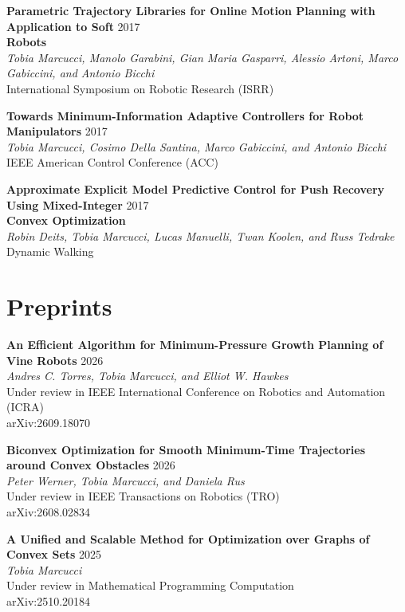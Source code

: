 \documentclass[11pt,a4paper,sans,twoside]{moderncv}
\begin{document}
\begin{enumerate}[label={[C\arabic*]}]
\item \textbf{Parametric Trajectory Libraries for Online Motion Planning with Application to Soft} \hfill 2017 \\ \textbf{Robots}  \\
\textit{Tobia Marcucci, Manolo Garabini, Gian Maria Gasparri, Alessio Artoni, Marco Gabiccini, and Antonio Bicchi} \\
International Symposium on Robotic Research (ISRR)

\item \textbf{Towards Minimum-Information Adaptive Controllers for Robot Manipulators} \hfill 2017 \\
\textit{Tobia Marcucci, Cosimo Della Santina, Marco Gabiccini, and Antonio Bicchi} \\
IEEE American Control Conference (ACC)
 
\item \textbf{Approximate Explicit Model Predictive Control for Push Recovery Using Mixed-Integer} \hfill 2017 \\ \textbf{Convex Optimization} \\
\textit{Robin Deits, Tobia Marcucci, Lucas Manuelli, Twan Koolen, and Russ Tedrake} \\
Dynamic Walking

\end{enumerate}

\section{Preprints}

\begin{enumerate}[label={[P\arabic*]}]

\item \textbf{An Efficient Algorithm for Minimum-Pressure Growth Planning of Vine Robots} \hfill 2026 \\
\textit{Andres C. Torres, Tobia Marcucci, and Elliot W. Hawkes} \\
Under review in IEEE International Conference on Robotics and Automation (ICRA) \\
arXiv:2609.18070

\item \textbf{Biconvex Optimization for Smooth Minimum-Time Trajectories around Convex Obstacles} \hfill 2026 \\
\textit{Peter Werner, Tobia Marcucci, and Daniela Rus} \\
Under review in IEEE Transactions on Robotics (TRO) \\
arXiv:2608.02834
	
\item \textbf{A Unified and Scalable Method for Optimization over Graphs of Convex Sets} \hfill 2025 \\
\textit{Tobia Marcucci} \\
Under review in Mathematical Programming Computation \\
arXiv:2510.20184

\end{enumerate}
\end{document}
